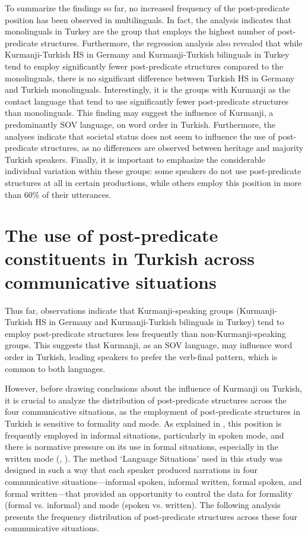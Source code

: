 To summarize the findings so far, no increased frequency of the post-predicate position has been observed in multilinguals. In fact, the analysis indicates that monolinguals in Turkey are the group that employs the highest number of post-predicate structures. Furthermore, the regression analysis also revealed that while Kurmanji-Turkish HS in Germany and Kurmanji-Turkish bilinguals in Turkey tend to employ significantly fewer post-predicate structures compared to the monolinguals, there is no significant difference between Turkish HS in Germany and Turkish monolinguals. Interestingly, it is the groups with Kurmanji as the contact language that tend to use significantly fewer post-predicate structures than monolinguals. This finding may suggest the influence of Kurmanji, a predominantly SOV language, on word order in Turkish. Furthermore, the analyses indicate that societal status does not seem to influence the use of post-predicate structures, as no differences are observed between heritage and majority Turkish speakers. Finally, it is important to emphasize the considerable individual variation within these groups: some speakers do not use post-predicate structures at all in certain productions, while others employ this position in more than 60\% of their utterances.

\section[The use of post-predicate constituents in Turkish]{The use of post-predicate constituents in Turkish across communicative situations}\label{sec:key:5.2}

Thus far, observations indicate that Kurmanji-speaking groups (Kurmanji-Turkish HS in Germany and Kurmanji-Turkish bilinguals in Turkey) tend to employ post-predicate structures less frequently than non-Kurmanji-speaking groups. This suggests that Kurmanji, as an SOV language, may influence word order in Turkish, leading speakers to prefer the verb-final pattern, which is common to both languages.

However, before drawing conclusions about the influence of Kurmanji on Turkish, it is crucial to analyze the distribution of post-predicate structures across the four communicative situations, as the employment of post-predicate structures in Turkish is sensitive to formality and mode. As explained in , this position is frequently employed in informal situations, particularly in spoken mode, and there is normative pressure on its use in formal situations, especially in the written mode (\citealt{Erguvanli1984}, \citealt{Schroeder1995}). The method `Language Situations' used in this study was designed in such a way that each speaker produced narrations in four communicative situations—informal spoken, informal written, formal spoken, and formal written—that provided an opportunity to control the data for formality (formal vs. informal) and mode (spoken vs. written). The following analysis presents the frequency distribution of post-predicate structures across these four communicative situations.

